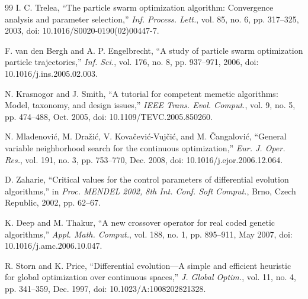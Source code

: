 {\begin{thebibliography}{99}
I. C. Trelea, ``The particle swarm optimization algorithm: Convergence analysis and parameter selection,'' \textit{Inf. Process. Lett.}, vol. 85, no. 6, pp. 317--325, 2003, doi: 10.1016/S0020-0190(02)00447-7.

F. van den Bergh and A. P. Engelbrecht, ``A study of particle swarm optimization particle trajectories,'' \textit{Inf. Sci.}, vol. 176, no. 8, pp. 937--971, 2006, doi: 10.1016/j.ins.2005.02.003.

N. Krasnogor and J. Smith, ``A tutorial for competent memetic algorithms: Model, taxonomy, and design issues,'' \textit{IEEE Trans. Evol. Comput.}, vol. 9, no. 5, pp. 474--488, Oct. 2005, doi: 10.1109/TEVC.2005.850260.

N. Mladenovi\'c, M. Dra\v{z}i\'c, V. Kova\v{c}evi\'c-Vuj\v{c}i\'c, and M. \v{C}angalovi\'c, ``General variable neighborhood search for the continuous optimization,'' \textit{Eur. J. Oper. Res.}, vol. 191, no. 3, pp. 753--770, Dec. 2008, doi: 10.1016/j.ejor.2006.12.064.

D. Zaharie, ``Critical values for the control parameters of differential evolution algorithms,'' in \textit{Proc. MENDEL 2002, 8th Int. Conf. Soft Comput.}, Brno, Czech Republic, 2002, pp. 62--67.

K. Deep and M. Thakur, ``A new crossover operator for real coded genetic algorithms,'' \textit{Appl. Math. Comput.}, vol. 188, no. 1, pp. 895--911, May 2007, doi: 10.1016/j.amc.2006.10.047.

R. Storn and K. Price, ``Differential evolution---A simple and efficient heuristic for global optimization over continuous spaces,'' \textit{J. Global Optim.}, vol. 11, no. 4, pp. 341--359, Dec. 1997, doi: 10.1023/A:1008202821328.


\end{thebibliography}}
